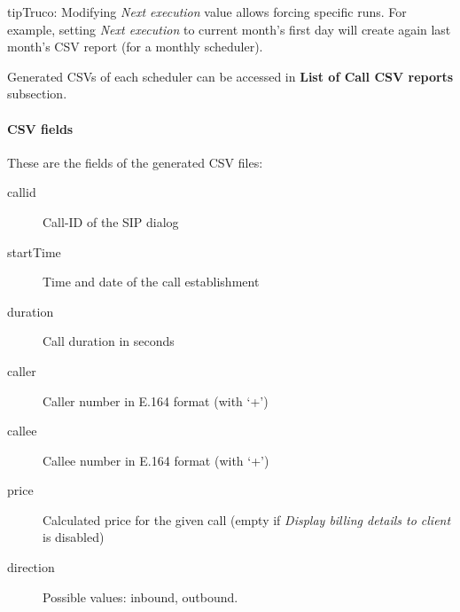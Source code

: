 \documentclass[letterpaper,10pt,spanish]{sphinxmanual}
\begin{document}
\begin{notice}{tip}{Truco:}
Modifying \emph{Next execution} value allows forcing specific runs. For example, setting \emph{Next execution} to
current month's first day will create again last month's CSV report (for a monthly scheduler).
\end{notice}

Generated CSVs of each scheduler can be accessed in \textbf{List of Call CSV reports} subsection.


\paragraph{CSV fields}
\label{administration_portal/client/retail/calls/call_csv_schedulers:csv-fields}
These are the fields of the generated CSV files:
\begin{description}
\item[{callid}] \leavevmode{}\label{administration_portal/client/retail/calls/call_csv_schedulers:term-callid}
Call-ID of the SIP dialog

\item[{startTime}] \leavevmode{}\label{administration_portal/client/retail/calls/call_csv_schedulers:term-starttime}
Time and date of the call establishment

\item[{duration}] \leavevmode{}\label{administration_portal/client/retail/calls/call_csv_schedulers:term-duration}
Call duration in seconds

\item[{caller}] \leavevmode{}\label{administration_portal/client/retail/calls/call_csv_schedulers:term-caller}
Caller number in E.164 format (with `+')

\item[{callee}] \leavevmode{}\label{administration_portal/client/retail/calls/call_csv_schedulers:term-callee}
Callee number in E.164 format (with `+')

\item[{price}] \leavevmode{}\label{administration_portal/client/retail/calls/call_csv_schedulers:term-price}
Calculated price for the given call (empty if \emph{Display billing details to client} is disabled)

\item[{direction}] \leavevmode{}\label{administration_portal/client/retail/calls/call_csv_schedulers:term-14}
Possible values: inbound, outbound.


\end{description}
\end{document}
